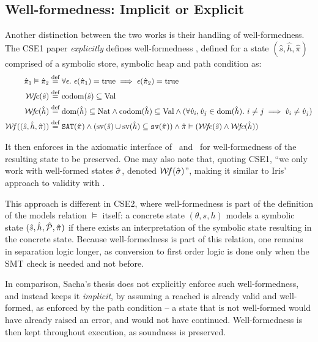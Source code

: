 \subsection{Well-formedness: Implicit or Explicit}
{
\newcommand{\heap}[0]{\hat h}
\newcommand{\store}[0]{\hat s}
\newcommand{\pc}[0]{\hat \pi}
\newcommand{\true}[0]{\text{true}}
Another distinction between the two works is their handling of well-formedness. The CSE1 paper \emph{explicitly} defines well-formedness \Wf, defined for a state $(\store, \heap, \pc)$ comprised of a symbolic store, symbolic heap and path condition as:
\begin{align*}
	\pc_1 \vDash \pc_2 &\defeq \forall\epsilon.~\epsilon(\pc_1)=\true \implies \epsilon(\pc_2)=\true\\
	\Wfc(\store)&\defeq \codom(\store)\subseteq \Val\\
	\Wfc(\heap)&\defeq \dom(\heap)\subseteq\Nat \land\codom(\heap)\subseteq\Val\land (\forall\hat v_i,\hat v_j\in\dom(\heap).~i\neq j \implies \hat v_i \neq \hat v_j)\\
	\Wf((\store,\heap,\pc)) &\defeq \SAT(\pc) \land(\text{sv}(\store)\cup \text{sv}(\heap)\subseteq \code{sv}(\pc)) \land \pc \vDash (\Wfc(\store)\land \Wfc(\heap))
\end{align*}

It then enforces in the axiomatic interface of \consume\ and \produce\ for well-formedness of the resulting state to be preserved. One may also note that, quoting CSE1, ``we only work with well-formed states $\hat{\sigma}$, denoted ${\cal W}\!f(\hat{\sigma})$'', making it similar to Iris' approach to validity with \irisval.

This approach is different in CSE2, where well-formedness is part of the definition of the models relation $\vDash$ itself: a concrete state $(\theta,s,h)$ models a symbolic state $(\store,\heap,\hat{\cal P},\pc)$ if there exists an interpretation of the symbolic state resulting in the concrete state. Because well-formedness is part of this relation, one remains in separation logic longer, as conversion to first order logic is done only when the SMT check is needed and not before. 

In comparison, Sacha's thesis does not explicitly enforce such well-formedness, and instead keeps it \emph{implicit}, by assuming a reached is already valid and well-formed, as enforced by the path condition -- a state that is not well-formed would have already raised an error, and would not have continued. Well-formedness is then kept throughout execution, as soundness is preserved.

}
